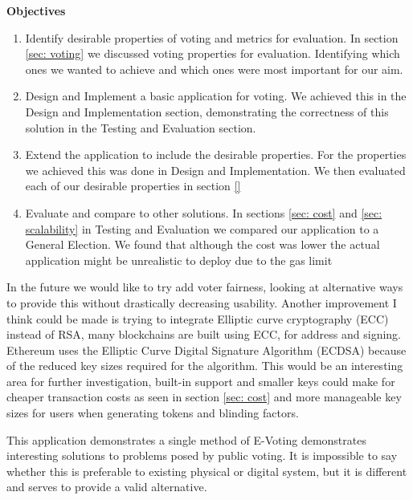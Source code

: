 \documentclass{entcs}
\begin{document}
{\bf Objectives}
\begin{enumerate}
    \item Identify desirable properties of voting and metrics for evaluation. In section \ref{sec: voting} we discussed voting properties for evaluation. Identifying which ones we wanted to achieve and which ones were most important for our aim.
    \item Design and Implement a basic application for voting. We achieved this in the Design and Implementation section, demonstrating the correctness of this solution in the Testing and Evaluation section.
    \item Extend the application to include the desirable properties. For the properties we achieved this was done in Design and Implementation. We then evaluated each of our desirable properties in section \ref{}
    \item Evaluate and compare to other solutions. In sections \ref{sec: cost} and \ref{sec: scalability} in Testing and Evaluation we compared our application to a General Election. We found that although the cost was lower the actual application might be unrealistic to deploy due to the gas limit 
\end{enumerate}


In the future we would like to try add voter fairness, looking at alternative ways to provide this without drastically decreasing usability. Another improvement I think could be made is trying to integrate Elliptic curve cryptography (ECC) instead of RSA, many blockchains are built using ECC, for address and signing. Ethereum uses the Elliptic Curve Digital Signature Algorithm (ECDSA) because of the reduced key sizes required for the algorithm. This would be an interesting area for further investigation, built-in support and smaller keys could make for cheaper transaction costs as seen in section \ref{sec: cost} and more manageable key sizes for users when generating tokens and blinding factors.

This application demonstrates a single method  of E-Voting demonstrates interesting solutions to problems posed by public voting. It is impossible to say whether this is preferable to existing physical or digital system, but it is different and serves to provide a valid alternative. 

\printbibliography
\end{document}
